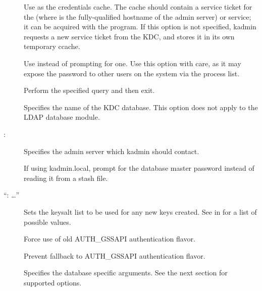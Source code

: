 \documentclass[letterpaper,10pt,english]{sphinxmanual}
\begin{document}
\begin{description}
\item[{ }] \leavevmode
Use  as the credentials cache.  The
cache should contain a service ticket for the 
(where  is the fully-qualified hostname of the admin
server) or  service; it can be acquired with the
 program.  If this option is not specified, kadmin
requests a new service ticket from the KDC, and stores it in its
own temporary ccache.

\item[{ }] \leavevmode
Use  instead of prompting for one.  Use this option with
care, as it may expose the password to other users on the system
via the process list.

\item[{ }] \leavevmode
Perform the specified query and then exit.

\item[{ }] \leavevmode
Specifies the name of the KDC database.  This option does not
apply to the LDAP database module.

\item[{ \sphinxstyleemphasis{admin\_server}{[}:\sphinxstyleemphasis{port}{]}}] \leavevmode
Specifies the admin server which kadmin should contact.

\item[{}] \leavevmode
If using kadmin.local, prompt for the database master password
instead of reading it from a stash file.

\item[{ “: …”}] \leavevmode
Sets the keysalt list to be used for any new keys created.  See
{\hyperref[\detokenize{admin/conf_files/kdc_conf:keysalt-lists}]{}} in {\hyperref[\detokenize{admin/conf_files/kdc_conf:kdc-conf-5}]{}} for a list of possible
values.

\item[{}] \leavevmode
Force use of old AUTH\_GSSAPI authentication flavor.

\item[{}] \leavevmode
Prevent fallback to AUTH\_GSSAPI authentication flavor.

\item[{ }] \leavevmode
Specifies the database specific arguments.  See the next section
for supported options.

\end{description}
\end{document}
